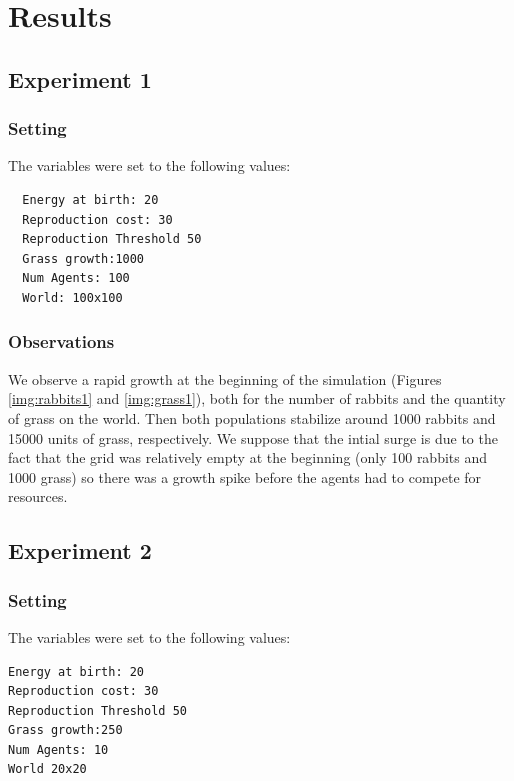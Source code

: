 \documentclass[11pt]{article}
\begin{document}
\section{Results}

\subsection{Experiment 1}

\subsubsection{Setting}
The variables were set to the following values:
\begin{lstlisting}
  Energy at birth: 20
  Reproduction cost: 30
  Reproduction Threshold 50
  Grass growth:1000
  Num Agents: 100
  World: 100x100
\end{lstlisting}
\subsubsection{Observations}
We observe a rapid growth at the beginning of the simulation (Figures \ref{img:rabbits1} and \ref{img:grass1}), both for the number of rabbits and the quantity of grass on the world. Then both populations stabilize around 1000 rabbits and 15000 units of grass, respectively. We suppose that the intial surge is due to the fact that the grid was relatively empty at the beginning (only 100 rabbits and 1000 grass) so there was a growth spike before the agents had to compete for resources.


\subsection{Experiment 2}

\subsubsection{Setting}
The variables were set to the following values:
\begin{lstlisting}
Energy at birth: 20
Reproduction cost: 30
Reproduction Threshold 50
Grass growth:250
Num Agents: 10
World 20x20
\end{lstlisting}
\end{document}
